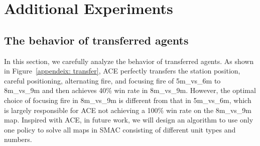 \documentclass[letterpaper]{article} \usepackage{aaai23}  \usepackage{times}  \usepackage{helvet}  \usepackage{courier}  \usepackage[hyphens]{url}  \usepackage{graphicx} \urlstyle{rm} \def\UrlFont{\rm}  \usepackage{natbib}  \usepackage{caption} \frenchspacing  \setlength{\pdfpagewidth}{8.5in} \setlength{\pdfpageheight}{11in} \usepackage{algorithm}
\begin{document}
\section{Additional Experiments}
\label{sec: add_exp}
\subsection{The behavior of transferred agents}
In this section, we carefully analyze the behavior of transferred agents. As shown in Figure~\ref{appendeix: transfer},  ACE perfectly transfers the station position, careful positioning, alternating fire, and focusing fire of 5m\_vs\_6m to 8m\_vs\_9m and then achieves 40\% win rate in 8m\_vs\_9m. However, the optimal choice of focusing fire in 8m\_vs\_9m is different from that in 5m\_vs\_6m, which is largely responsible for ACE not achieving a 100$\%$ win rate on the 8m\_vs\_9m map.
Inspired with ACE, in future work, we will design an algorithm to use only one policy to solve all maps in SMAC consisting of different unit types and numbers.
\end{document}
